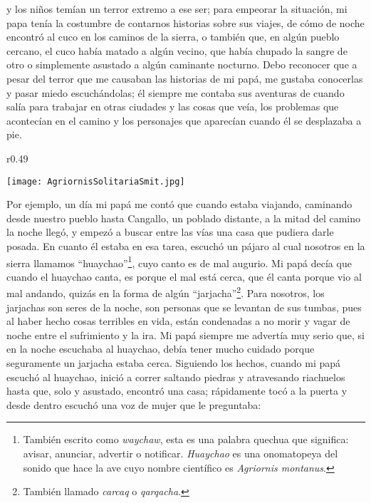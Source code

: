 y los niños temían un terror extremo a ese ser; para empeorar la situación, mi papa tenía la costumbre de contarnos historias sobre sus viajes, de cómo de noche encontró al cuco en los caminos de la sierra, 
o también que, en algún pueblo cercano, el cuco había matado a algún vecino, que había chupado la sangre de otro o simplemente asustado a algún caminante nocturno. 
Debo reconocer que a pesar del terror que me causaban las historias de mi papá, me gustaba conocerlas y pasar miedo escuchándolas; 
él siempre me contaba sus aventuras de cuando salía para trabajar en otras ciudades y las cosas que veía, los problemas que acontecían en el camino y los personajes que aparecían cuando él se desplazaba a pie.

\ifdefined\EnableIncludeImages
\begin{wrapfigure}{r}{0.49\textwidth}
  \begin{center}
  \vspace{-20pt}
    \texttt{[image: AgriornisSolitariaSmit.jpg]}
  \end{center}
  \vspace{-20pt}
\end{wrapfigure}
\fi
Por ejemplo, un día mi papá me contó que cuando estaba viajando, caminando desde nuestro pueblo hasta Cangallo, un poblado distante, a la mitad del camino la noche llegó, y empezó a buscar entre las vías una casa que pudiera darle posada. 
En cuanto él estaba en esa tarea, escuchó un pájaro al cual nosotros en la sierra llamamos ``huaychao''\footnote{También escrito como \textit{waychaw}, esta es una palabra quechua que significa: avisar, anunciar, advertir o notificar. \textit{Huaychao} es una onomatopeya del sonido que hace la ave cuyo nombre científico es \textit{Agriornis montanus}.}, cuyo canto es de mal augurio.
Mi papá decía que cuando el huaychao canta, es porque el mal está cerca, que él canta porque vio al mal andando, quizás en la forma de algún ``jarjacha''\footnote{También llamado \textit{carcaq} o \textit{qarqacha}.}. 
Para nosotros, los jarjachas son seres de la noche, son personas que se levantan de sus tumbas, pues al haber hecho cosas terribles en vida, están condenadas a no morir y vagar de noche entre el sufrimiento y la ira.
Mi papá siempre me advertía muy serio que, si en la noche escuchaba al huaychao, debía tener mucho cuidado porque seguramente un jarjacha estaba cerca.
Siguiendo los hechos, cuando mi papá escuchó al huaychao, inició a correr saltando piedras y atravesando riachuelos hasta que, solo y asustado, encontró una casa; rápidamente tocó a la puerta y desde dentro escuchó una voz de mujer que le preguntaba:\\\indent
